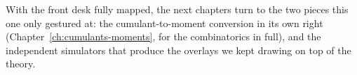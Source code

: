With the front desk fully mapped, the next chapters turn to the two pieces this
one only gestured at: the cumulant-to-moment conversion in its own right
(Chapter~\ref{ch:cumulants-moments}, for the combinatorics in full), and the
independent simulators that produce the  overlays we kept drawing on
top of the theory.
